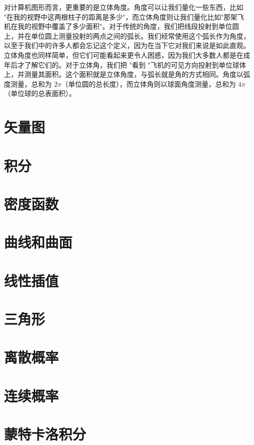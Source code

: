\documentclass[lang=cn,10pt]{elegantbook}
\begin{document}
对计算机图形而言，更重要的是立体角度。角度可以让我们量化一些东西，比如 "在我的视野中这两根柱子的距离是多少"，而立体角度则让我们量化比如"那架飞机在我的视野中覆盖了多少面积"。对于传统的角度，我们把线段投射到单位圆上，并在单位圆上测量投射的两点之间的弧长。我们经常使用这个弧长作为角度，以至于我们中的许多人都会忘记这个定义，因为在当下它对我们来说是如此直观。立体角度也同样简单，但它们可能看起来更令人困惑，因为我们大多数人都是在成年后才了解它们的。对于立体角，我们把 "看到 "飞机的可见方向投射到单位球体上，并测量其面积。这个面积就是立体角度，与弧长就是角的方式相同。角度以弧度测量，总和为 $2\pi$（单位圆的总长度），而立体角则以球面角度测量，总和为 $4\pi$（单位球的总表面积）。

\section{矢量图}

\section{积分}

\section{密度函数}

\section{曲线和曲面}

\section{线性插值}

\section{三角形}

\section{离散概率}

\section{连续概率}

\section{蒙特卡洛积分}
\end{document}
